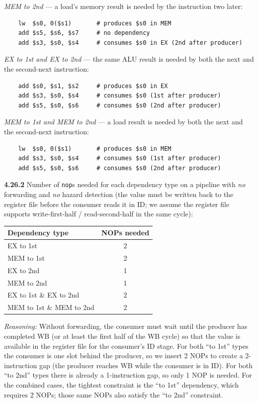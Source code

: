 \textit{MEM to 2nd} --- a load's memory result is needed by the instruction two
later:
\begin{verbatim}
    lw  $s0, 0($s1)       # produces $s0 in MEM
    add $s5, $s6, $s7     # no dependency
    add $s3, $s0, $s4     # consumes $s0 in EX (2nd after producer)
\end{verbatim}

\textit{EX to 1st and EX to 2nd} --- the same ALU result is needed by both the
next and the second-next instruction:
\begin{verbatim}
    add $s0, $s1, $s2     # produces $s0 in EX
    add $s3, $s0, $s4     # consumes $s0 (1st after producer)
    add $s5, $s0, $s6     # consumes $s0 (2nd after producer)
\end{verbatim}

\textit{MEM to 1st and MEM to 2nd} --- a load result is needed by both the next
and the second-next instruction:
\begin{verbatim}
    lw  $s0, 0($s1)       # produces $s0 in MEM
    add $s3, $s0, $s4     # consumes $s0 (1st after producer)
    add $s5, $s0, $s6     # consumes $s0 (2nd after producer)
\end{verbatim}

\medskip\noindent\textbf{4.26.2}
Number of \texttt{nop}s needed for each dependency type on a pipeline with
\emph{no} forwarding and \emph{no} hazard detection (the value must be written
back to the register file before the consumer reads it in ID; we assume the
register file supports write-first-half / read-second-half in the same cycle):

\begin{center}
\begin{tabular}{lc}
\toprule
\textbf{Dependency type} & \textbf{NOPs needed} \\
\midrule
EX to 1st              & 2 \\
MEM to 1st             & 2 \\
EX to 2nd              & 1 \\
MEM to 2nd             & 1 \\
EX to 1st \& EX to 2nd   & 2 \\
MEM to 1st \& MEM to 2nd & 2 \\
\bottomrule
\end{tabular}
\end{center}

\textit{Reasoning:} Without forwarding, the consumer must wait until the producer
has completed WB (or at least the first half of the WB cycle) so that the value
is available in the register file for the consumer's ID stage. For both
``to 1st'' types the consumer is one slot behind the producer, so we insert 2
NOPs to create a 2-instruction gap (the producer reaches WB while the consumer
is in ID). For both ``to 2nd'' types there is already a 1-instruction gap, so
only 1 NOP is needed. For the combined cases, the tightest constraint is the
``to 1st'' dependency, which requires 2 NOPs; those same NOPs also satisfy the
``to 2nd'' constraint.

